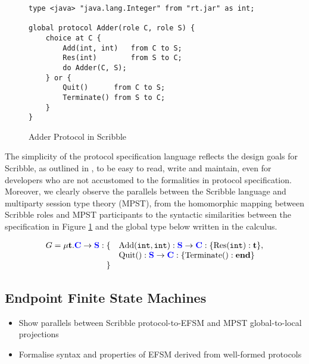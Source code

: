 \begin{figure}[!h]
\begin{lstlisting}
type <java> "java.lang.Integer" from "rt.jar" as int;

global protocol Adder(role C, role S) {
	choice at C {
		Add(int, int)	from C to S;
		Res(int)		from S to C;
		do Adder(C, S);
	} or {
		Quit()		from C to S;
		Terminate()	from S to C;	
	}
}
\end{lstlisting}
\caption{Adder Protocol in Scribble}
\label{fig:adder_scr}
\end{figure}

The simplicity of the protocol specification language reflects the design goals for Scribble, as outlined in \cite{Scribble}, to be easy to read, write and maintain, even for developers who are not accustomed to the formalities in protocol specification. Moreover, we clearly observe the parallels between the Scribble language and multiparty session type theory (MPST), from the homomorphic mapping between Scribble roles and MPST participants to the syntactic similarities between the specification in Figure \ref{fig:adder_scr} and the global type below written in the calculus.

\[
\begin{array}{rl}
G = \mu\mathbf{t}.{\color{blue}\mathbf{C}}\to{\color{blue}\mathbf{S}}:\{
& \text{Add}(\texttt{int}, \texttt{int}): {\color{blue}\mathbf{S}}\to{\color{blue}\mathbf{C}}: \{\text{Res}(\texttt{int}): \mathbf{t}\}, \\
& \text{Quit}(): {\color{blue}\mathbf{S}}\to{\color{blue}\mathbf{C}}: \{\text{Terminate}(): \mathbf{end}\}\\
\} &
\end{array}
\]


\subsection{Endpoint Finite State Machines}
\begin{itemize}
\item Show parallels between Scribble protocol-to-EFSM and MPST global-to-local projections
\item Formalise syntax and properties of EFSM derived from well-formed protocols
\end{itemize}

